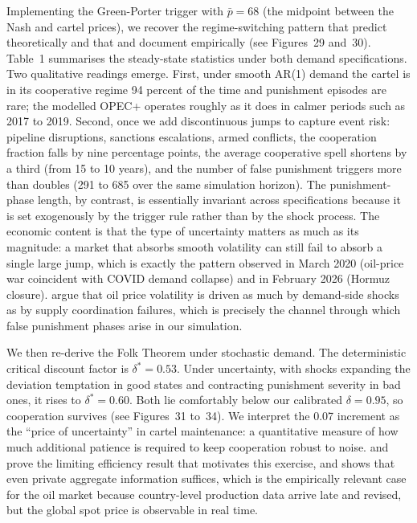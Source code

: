 Implementing the Green-Porter trigger with $\bar{p} = 68$ (the midpoint
between the Nash and cartel prices), we recover the regime-switching
pattern that \citet{greenporter1984} predict theoretically and that
\citet{porter1983} and \citet{almoguera2011} document empirically (see
Figures~29 and~30). Table~1 summarises the steady-state statistics
under both demand specifications. Two qualitative readings emerge.
First, under smooth AR(1) demand the cartel is in its cooperative
regime 94 percent of the time and punishment episodes are rare; the
modelled OPEC+ operates roughly as it does in calmer periods such as
2017 to 2019. Second, once we add discontinuous jumps to capture event
risk: pipeline disruptions, sanctions escalations, armed conflicts,
the cooperation fraction falls by nine percentage points, the average
cooperative spell shortens by a third (from 15 to 10 years), and the
number of false punishment triggers more than doubles (291 to 685 over
the same simulation horizon). The punishment-phase length, by contrast,
is essentially invariant across specifications because it is set
exogenously by the trigger rule rather than by the shock process. The
economic content is that the type of uncertainty matters as much as
its magnitude: a market that absorbs smooth volatility can still fail
to absorb a single large jump, which is exactly the pattern observed
in March 2020 (oil-price war coincident with COVID demand collapse)
and in February 2026 (Hormuz closure). \citet{barskykilian2004} argue
that oil price volatility is driven as much by demand-side shocks as
by supply coordination failures, which is precisely the channel through
which false punishment phases arise in our simulation.

We then re-derive the Folk Theorem under stochastic demand. The
deterministic critical discount factor is $\delta^* = 0.53$. Under
uncertainty, with shocks expanding the deviation temptation in good
states and contracting punishment severity in bad ones, it rises to
$\delta^* = 0.60$. Both lie comfortably below our calibrated
$\delta = 0.95$, so cooperation survives (see Figures~31 to~34). We
interpret the 0.07 increment as the ``price of uncertainty'' in cartel
maintenance: a quantitative measure of how much additional patience is
required to keep cooperation robust to noise. \citet{app1990} and
\citet{flm1994} prove the limiting efficiency result that motivates
this exercise, and \citet{jin1999} shows that even private aggregate
information suffices, which is the empirically relevant case for the
oil market because country-level production data arrive late and
revised, but the global spot price is observable in real time.

